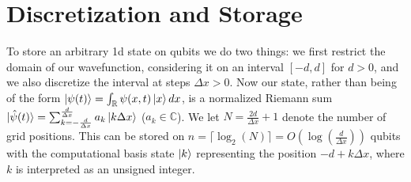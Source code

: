 \documentclass[10pt]{article}
\begin{document}
\section*{Discretization and Storage}
To store an arbitrary 1d state on qubits we do two things: we first restrict the domain of our wavefunction,
considering it on an interval $[-d, d]$ for $d > 0$, and we also discretize the
interval at steps $\Delta x > 0$. Now our state, rather than being of the form
$\ket{\psi(t)} = \int_{\mathbb{R}} \psi(x, t) \ket{x} dx$, is a normalized
Riemann sum $\ket{\hat{\psi}(t)} = \sum_{k = -\frac{d}{\Delta x}}^{\frac{d}{\Delta x}} a_k \ket{k \Delta x}$
($a_k \in \mathbb{C}$). We let $N = \frac{2d}{\Delta x}+1$ denote the number of grid positions.
This can be stored on $n = \lceil \log_2\left(N\right) \rceil = O\left(\log \left(\frac{d}{\Delta x} 
\right) \right)$ qubits with the computational basis state $\ket{k}$ representing
the position $-d + k \Delta x$, where $k$ is interpreted as an unsigned integer.
\end{document}
